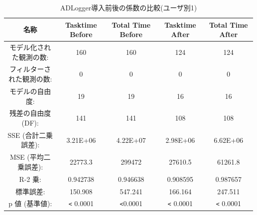 \begin{table}[ht]
\begin{center}
 \caption{ADLogger導入前後の係数の比較(ユーザ別1)}
\begin{tabular}{|c|c|c|c|c|} \hline
名称 & Tasktime Before & Total Time Before & Tasktime After & Total Time After \\\hline
モデル化された観測の数: & 160 & 160 & 124 & 124 \\\hline
フィルターされた観測の数: & 0 & 0 & 0 & 0 \\\hline
モデルの自由度: & 19 & 19 & 16 & 16 \\\hline
残差の自由度 (DF): & 141 & 141 & 108 & 108 \\\hline
SSE (合計二乗誤差): & 3.21E+06 & 4.22E+07 & 2.98E+06 & 6.62E+06 \\\hline
MSE (平均二乗誤差): & 22773.3 & 299472 & 27610.5 & 61261.8 \\\hline
R-2 乗: & 0.942738 & 0.946638 & 0.908595 & 0.987657 \\\hline
標準誤差: & 150.908 & 547.241 & 166.164 & 247.511 \\\hline
p 値 (基準値): &\verb|<| 0.0001 & \verb|<|0.0001 & \verb|<| 0.0001 & \verb|<| 0.0001 \\\hline
\end{tabular}
  \label{tb:test3}
\end{center}
\end{table}


